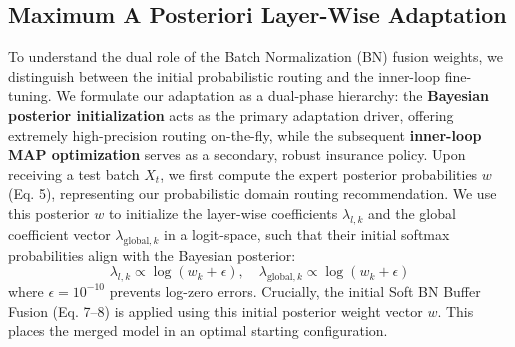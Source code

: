 \documentclass{article}
\theoremstyle{plain}
\theoremstyle{definition}
\theoremstyle{remark}
\begin{document}
\subsection{Maximum A Posteriori Layer-Wise Adaptation}\vspace{-0.1in}
To understand the dual role of the Batch Normalization (BN) fusion weights, we distinguish between
the initial probabilistic routing and the inner-loop fine-tuning. We formulate our adaptation as a
dual-phase hierarchy: the \textbf{Bayesian posterior initialization} acts as the primary adaptation
driver, offering extremely high-precision routing on-the-fly, while the subsequent
\textbf{inner-loop MAP optimization} serves as a secondary, robust insurance policy. Upon receiving
a test batch $X_t$, we first compute the expert posterior probabilities $w$ (Eq. 5), representing
our probabilistic domain routing recommendation. We use this posterior $w$ to initialize the
layer-wise coefficients $\lambda_{l,k}$ and the global coefficient vector
$\lambda_{\text{global},k}$ in a logit-space, such that their initial softmax probabilities align
with the Bayesian posterior:
\begin{equation}
\lambda_{l,k} \propto \log(w_k + \epsilon), \quad \lambda_{\text{global},k} \propto \log(w_k +
\epsilon)
\end{equation}
where $\epsilon = 10^{-10}$ prevents log-zero errors. Crucially, the initial Soft BN Buffer Fusion
(Eq. 7--8) is applied using this initial posterior weight vector $w$. This places the merged model
in an optimal starting configuration.
\end{document}
